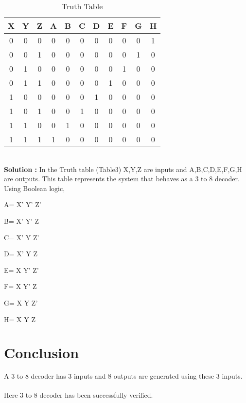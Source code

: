 \documentclass[journal,12pt,twocolumn]{IEEEtran}
\begin{document}
    \begin{table}[h]
    \centering
    \begin{tabular}{| c | c | c || c | c | c | c | c | c | c | c |}
    \hline
    \textbf{X} & \textbf{Y} & \textbf{Z} & \textbf{A} & \textbf{B} & \textbf{C} & \textbf{D} & \textbf{E} & \textbf{F} & \textbf{G} & \textbf{H} \\
    \hline
    0 & 0 & 0 & 0 & 0 & 0 & 0 & 0 & 0 & 0 & 1  \\
    \hline
    0 & 0 & 1 & 0 & 0 & 0 & 0 & 0 & 0 & 1 & 0  \\
    \hline
    0 & 1 & 0 & 0 & 0 & 0 & 0 & 0 & 1 & 0 & 0  \\
    \hline
    0 & 1 & 1 & 0 & 0 & 0 & 0 & 1 & 0 & 0 & 0  \\
    \hline
    1 & 0 & 0 & 0 & 0 & 0 & 1 & 0 & 0 & 0 & 0  \\
    \hline
    1 & 0 & 1 & 0 & 0 & 1 & 0 & 0 & 0 & 0 & 0  \\
    \hline
    1 & 1 & 0 & 0 & 1 & 0 & 0 & 0 & 0 & 0 & 0  \\
    \hline
    1 & 1 & 1 & 1 & 0 & 0 & 0 & 0 & 0 & 0 & 0  \\
    \hline
    \end{tabular}
    \caption{Truth Table}
    \label{tab:my_label}
 \end{table}
 \\
\textbf{Solution :}  In the Truth table (Table3) X,Y,Z are inputs and A,B,C,D,E,F,G,H are outputs. This table represents the system that behaves as a 3 to 8 decoder. Using Boolean logic, \\
 \begin{center}
     A= X' Y' Z'\\
 \end{center}
  \begin{center}
      B= X' Y' Z\\
 \end{center}
  \begin{center}
      C= X' Y Z'\\
 \end{center}
  \begin{center}
      D= X' Y Z\\
 \end{center}
  \begin{center}
     E= X Y' Z'\\
 \end{center}
  \begin{center}
     F= X Y' Z\\
 \end{center}
  \begin{center}
     G= X Y Z'\\
 \end{center}
  \begin{center}
     H= X Y Z\\
 \end{center} 
 \section{Conclusion}
 A 3 to 8 decoder has 3 inputs and 8 outputs are generated using these 3 inputs.\\
 \\
  Here 3 to 8 decoder has been successfully verified.\\
\end{document}

